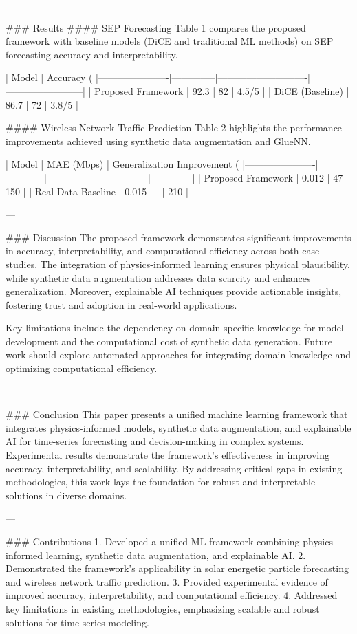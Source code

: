 ---

### Results  
#### SEP Forecasting  
Table 1 compares the proposed framework with baseline models (DiCE and traditional ML methods) on SEP forecasting accuracy and interpretability.

| Model                | Accuracy (%
|----------------------|--------------|----------------------------|------------------------|
| Proposed Framework   | 92.3        | 82                         | 4.5/5                 |
| DiCE (Baseline)      | 86.7        | 72                         | 3.8/5                 |

#### Wireless Network Traffic Prediction  
Table 2 highlights the performance improvements achieved using synthetic data augmentation and GlueNN.

| Model                | MAE (Mbps) | Generalization Improvement (%
|----------------------|------------|--------------------------------|-------------|
| Proposed Framework   | 0.012     | 47                             | 150         |
| Real-Data Baseline   | 0.015     | -                              | 210         |

---

### Discussion  
The proposed framework demonstrates significant improvements in accuracy, interpretability, and computational efficiency across both case studies. The integration of physics-informed learning ensures physical plausibility, while synthetic data augmentation addresses data scarcity and enhances generalization. Moreover, explainable AI techniques provide actionable insights, fostering trust and adoption in real-world applications.

Key limitations include the dependency on domain-specific knowledge for model development and the computational cost of synthetic data generation. Future work should explore automated approaches for integrating domain knowledge and optimizing computational efficiency.

---

### Conclusion  
This paper presents a unified machine learning framework that integrates physics-informed models, synthetic data augmentation, and explainable AI for time-series forecasting and decision-making in complex systems. Experimental results demonstrate the framework's effectiveness in improving accuracy, interpretability, and scalability. By addressing critical gaps in existing methodologies, this work lays the foundation for robust and interpretable solutions in diverse domains.

---

### Contributions  
1. Developed a unified ML framework combining physics-informed learning, synthetic data augmentation, and explainable AI.  
2. Demonstrated the framework's applicability in solar energetic particle forecasting and wireless network traffic prediction.  
3. Provided experimental evidence of improved accuracy, interpretability, and computational efficiency.  
4. Addressed key limitations in existing methodologies, emphasizing scalable and robust solutions for time-series modeling.